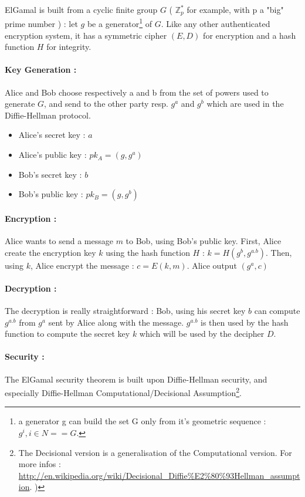 ElGamal is built from a cyclic finite group $G$ ( $\mathbb{Z}_p^*$ for example, with p a "big" prime number ) : let $g$ be a generator\footnote{a generator g can build the set G only from it's geometric sequence : ${g^i, i\in N} == G$.}  of $G$. Like any other authenticated encryption system, it has a symmetric cipher $(E,D)$ for encryption and a hash function $H$ for integrity.

\paragraph{Key Generation :}
 Alice and Bob choose respectively a and b from the set of powers used to generate $G$, and send to the other party resp. $g^a$ and $g^b$ which are used in the Diffie-Hellman protocol. 
 
\begin{itemize}
	\item Alice's secret key : $a$
	\item Alice's public key : $pk_A = (g, g^a)$
	\item Bob's secret key : $b$
	\item Bob's public key : $pk_B = (g, g^b)$
\end{itemize}
 
\paragraph{Encryption :}

Alice wants to send a message $m$ to Bob, using Bob's public key. First, Alice create the encryption key $k$ using the hash function $H$ : $k = H(g^b, g^{a.b}) $. Then, using $k$, Alice encrypt the message : $c = E(k,m)$. Alice output $(g^a, c)$

\paragraph{Decryption :} 
The decryption is really straightforward : Bob, using his secret key $b$ can compute $g^{a.b}$ from $g^a$ sent by Alice along with the message. $g^{a.b}$ is then used by the hash function to compute the secret key $k$ which will be used by the decipher $D$.

\paragraph{Security : \\}

The ElGamal security theorem is built upon Diffie-Hellman security, and especially Diffie-Hellman Computational/Decisional Assumption\footnote{The Decisional version is a generalisation of the Computational version. For more infos : \url{http://en.wikipedia.org/wiki/Decisional_Diffie\%E2\%80\%93Hellman_assumption}. )}.

